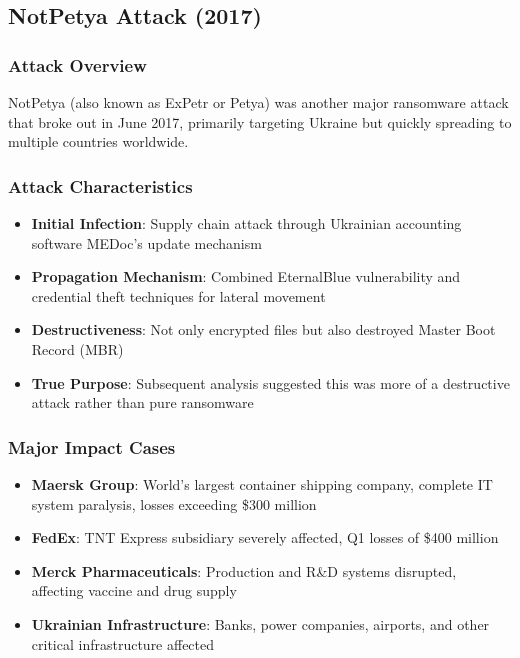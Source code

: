 \documentclass[12pt,a4paper]{article}
\begin{document}
\subsection{NotPetya Attack (2017)}

\subsubsection{Attack Overview}
NotPetya (also known as ExPetr or Petya) was another major ransomware attack that broke out in June 2017, primarily targeting Ukraine but quickly spreading to multiple countries worldwide.

\subsubsection{Attack Characteristics}
\begin{itemize}
    \item \textbf{Initial Infection}: Supply chain attack through Ukrainian accounting software MEDoc's update mechanism
    \item \textbf{Propagation Mechanism}: Combined EternalBlue vulnerability and credential theft techniques for lateral movement
    \item \textbf{Destructiveness}: Not only encrypted files but also destroyed Master Boot Record (MBR)
    \item \textbf{True Purpose}: Subsequent analysis suggested this was more of a destructive attack rather than pure ransomware
\end{itemize}

\subsubsection{Major Impact Cases}
\begin{itemize}
    \item \textbf{Maersk Group}: World's largest container shipping company, complete IT system paralysis, losses exceeding \$300 million
    \item \textbf{FedEx}: TNT Express subsidiary severely affected, Q1 losses of \$400 million
    \item \textbf{Merck Pharmaceuticals}: Production and R\&D systems disrupted, affecting vaccine and drug supply
    \item \textbf{Ukrainian Infrastructure}: Banks, power companies, airports, and other critical infrastructure affected
\end{itemize}
\end{document}
